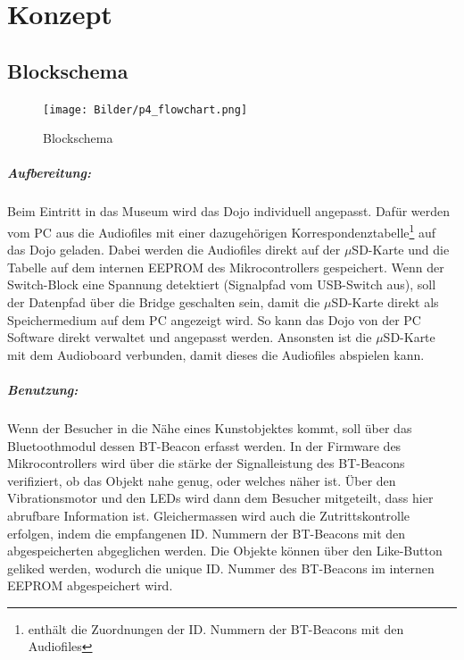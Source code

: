 \chapter{Konzept}
\thispagestyle{fancy} 
\section{Blockschema}
\begin{figure}[H]
\centering
\texttt{[image: Bilder/p4\_flowchart.png]}
\caption{Blockschema}
\label{fig:flowchart}
\end{figure}
\vspace*{-0.6cm}
\newpage
\paragraph*{Aufbereitung:}
Beim Eintritt in das Museum wird das Dojo individuell angepasst. Dafür werden vom PC aus die Audiofiles mit einer dazugehörigen Korrespondenztabelle\footnote{enthält die Zuordnungen der ID. Nummern der BT-Beacons mit den Audiofiles } auf das Dojo geladen. Dabei werden die Audiofiles direkt auf der $\mu$SD-Karte und die Tabelle auf dem internen EEPROM des Mikrocontrollers gespeichert. Wenn der Switch-Block eine Spannung detektiert (Signalpfad vom USB-Switch aus), soll der Datenpfad über die Bridge geschalten sein, damit die $\mu$SD-Karte direkt als Speichermedium auf dem PC angezeigt wird. So kann das Dojo von der PC Software direkt verwaltet und angepasst werden. Ansonsten ist die $\mu$SD-Karte mit dem Audioboard verbunden, damit dieses die Audiofiles abspielen kann.
\paragraph*{Benutzung:}
Wenn der Besucher in die Nähe eines Kunstobjektes kommt, soll über das Bluetoothmodul dessen BT-Beacon erfasst werden. In der Firmware des Mikrocontrollers wird über die stärke der Signalleistung des BT-Beacons verifiziert, ob das Objekt nahe genug, oder welches näher ist. Über den Vibrationsmotor und den LEDs wird dann dem Besucher mitgeteilt, dass hier abrufbare Information ist. Gleichermassen wird auch die Zutrittskontrolle erfolgen, indem die empfangenen ID. Nummern der BT-Beacons mit den abgespeicherten abgeglichen werden. Die Objekte können über den Like-Button geliked werden, wodurch die unique ID. Nummer des BT-Beacons im internen EEPROM abgespeichert wird.
